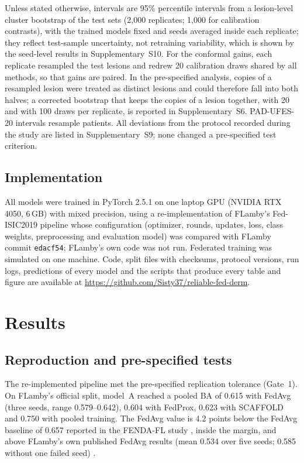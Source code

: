 \documentclass[VANCOUVER,Times1COL]{WileyNJDv5}
\begin{document}
Unless stated otherwise, intervals are 95\% percentile intervals from a lesion-level cluster bootstrap
\cite{field2007cluster} of the test sets (2,000 replicates; 1,000 for calibration
contrasts), with the trained models fixed and seeds averaged inside each replicate; they reflect
test-sample uncertainty, not retraining variability, which is shown by the seed-level results in
Supplementary~S10. For the conformal gains, each replicate resampled the test lesions and redrew 20
calibration draws shared by all methods, so that gains are paired. In the pre-specified analysis, copies of
a resampled lesion were treated as distinct lesions and could therefore fall into both halves; a corrected
bootstrap that keeps the copies of a lesion together, with 20 and with 100 draws per replicate, is
reported in Supplementary~S6. PAD-UFES-20 intervals resample patients. All deviations from the protocol recorded during the study are
listed in Supplementary~S9; none changed a pre-specified test criterion.

\subsection{Implementation}
\label{sec:impl}

All models were trained in PyTorch 2.5.1 \cite{paszke2019pytorch} on one laptop GPU (NVIDIA RTX 4050,
6\,GB) with mixed precision, using a re-implementation of FLamby's Fed-ISIC2019 pipeline whose
configuration (optimizer, rounds, updates, loss, class weights, preprocessing and evaluation model) was
compared with FLamby commit \texttt{edacf54}; FLamby's own code was not run. Federated training was
simulated on one machine. Code, split files with checksums, protocol versions, run logs, predictions of
every model and the scripts that produce every table and figure are available at
\url{https://github.com/Sisty37/reliable-fed-derm}.

\section{Results}
\label{sec:results}

\subsection{Reproduction and pre-specified tests}
\label{sec:res-tests}

The re-implemented pipeline met the pre-specified replication tolerance (Gate~1). On FLamby's official
split, model~A reached a pooled BA of 0.615 with FedAvg (three seeds, range 0.579--0.642), 0.604 with
FedProx, 0.623 with SCAFFOLD and 0.750 with pooled training. The FedAvg value is 4.2 points below the
FedAvg baseline of 0.657 reported in the FENDA-FL study \cite{tavakoli2024fendafl}, inside the margin,
and above FLamby's own published FedAvg results (mean 0.534 over five seeds; 0.585 without one failed
seed) \cite{flamby2022}.
\end{document}
